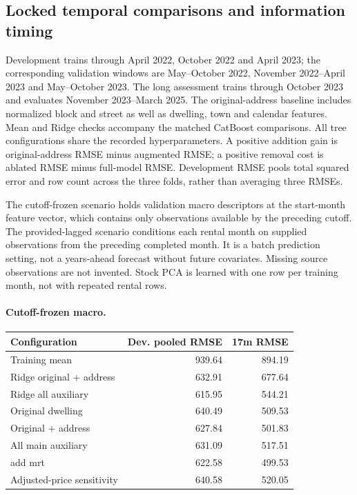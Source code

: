 \documentclass[10pt]{article}
\begin{document}
\subsection{Locked temporal comparisons and information timing}
Development trains through April 2022, October 2022 and April 2023; the corresponding validation windows are May--October 2022, November 2022--April 2023 and May--October 2023. The long assessment trains through October 2023 and evaluates November 2023--March 2025. 
The original-address baseline includes normalized block and street as well as dwelling, town and calendar features. Mean and Ridge checks accompany the matched CatBoost comparisons. All tree configurations share the recorded hyperparameters. A positive addition gain is original-address RMSE minus augmented RMSE; a positive removal cost is ablated RMSE minus full-model RMSE. Development RMSE pools total squared error and row count across the three folds, rather than averaging three RMSEs.

The cutoff-frozen scenario holds validation macro descriptors at the start-month feature vector, which contains only observations available by the preceding cutoff. The provided-lagged scenario conditions each rental month on supplied observations from the preceding completed month. It is a batch prediction setting, not a years-ahead forecast without future covariates. Missing source observations are not invented. Stock PCA is learned with one row per training month, not with repeated rental rows.

\paragraph{Cutoff-frozen macro.}
\begin{center}
\small
\begin{tabular}{lrr}
\toprule
Configuration & Dev. pooled RMSE & 17m RMSE \\
\midrule
Training mean & 939.64 & 894.19 \\
Ridge original + address & 632.91 & 677.64 \\
Ridge all auxiliary & 615.95 & 544.21 \\
Original dwelling & 640.49 & 509.53 \\
Original + address & 627.84 & 501.83 \\
All main auxiliary & 631.09 & 517.51 \\
add mrt & 622.58 & 499.53 \\
Adjusted-price sensitivity & 640.58 & 520.05 \\
\bottomrule
\end{tabular}
\end{center}
\end{document}
